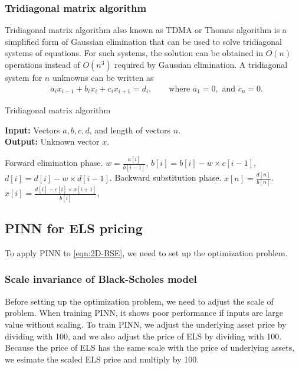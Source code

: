 \documentclass[11pt,reqno]{article}
\numberwithin{equation}{section}
\begin{document}
{\subsubsection{Tridiagonal matrix algorithm}
Tridiagonal matrix algorithm also known as TDMA or Thomas algorithm is a simplified form of Gaussian elimination that can be used to solve tridiagonal systems of equations.
 For such systems, the solution can be obtained in $O(n)$ operations instead of $O(n^{3})$
  required by Gaussian elimination. %
  A tridiagonal system for $n$ unknowns can be written as 
\begin{equation*}%
\begin{aligned}
&    a_i x_{i-1} + b_i x_i + c_i x_{i+1} = d_i, \qquad
    \text{where }a_1=0, \text{ and } c_n = 0.
\end{aligned}
\end{equation*}
\begin{algorithm}[H]\small
\caption{Tridiagonal matrix algorithm}
    \textbf{Input:}
     Vectors $a, b, c, d$, and length of vectors $n$. \\
    \textbf{Output:}
    Unknown vector $x$.
\begin{algorithmic}
    \State Forward elimination phase.
        \State $w = \frac{a[i]}{b[i-1]}$,
        \State $b[i] = b[i] - w \times c[i-1]$,
        \State $d[i] = d[i] - w \times d[i-1]$.
    \EndFor 
    \State Backward substitution phase.
    \State $x[n] = \frac{d[n]}{b[n]}$. 
        \State $x[i] = \frac{d[i] - c[i] \times x[i+1]}{b[i]}$, 
    \EndFor
\end{algorithmic}
\end{algorithm}

\subsection{PINN for ELS pricing}
To apply PINN to \eqref{eqn:2D-BSE}, we need to set up the optimization problem.

\subsubsection{Scale invariance of Black-Scholes model}
Before setting up the optimization problem, we need to adjust the scale of problem.
 When training PINN, it shows poor performance if inputs are large value without scaling.
  To train PINN, we adjust the underlying asset price by dividing with 100,
  and we also adjust the price of ELS by dividing with 100.
  Because the price of ELS has the same scale with the price of underlying assets,
   we esimate the scaled ELS price and multiply by 100.

}
\end{document}
